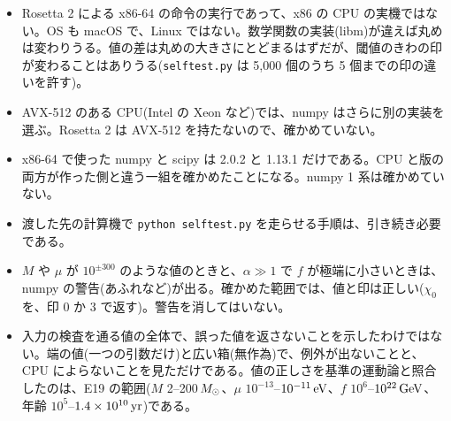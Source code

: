 \begin{caveat}
\begin{itemize}
\item Rosetta 2 による x86-64 の命令の実行であって、x86 の CPU の実機ではない。OS も macOS で、Linux ではない。数学関数の実装(libm)が違えば丸めは変わりうる。値の差は丸めの大きさにとどまるはずだが、閾値のきわの印が変わることはありうる(\texttt{selftest.py} は 5{,}000 個のうち 5 個までの印の違いを許す)。
\item AVX-512 のある CPU(Intel の Xeon など)では、numpy はさらに別の実装を選ぶ。Rosetta 2 は AVX-512 を持たないので、確かめていない。
\item x86-64 で使った numpy と scipy は 2.0.2 と 1.13.1 だけである。CPU と版の両方が作った側と違う一組を確かめたことになる。numpy 1 系は確かめていない。
\item 渡した先の計算機で \texttt{python selftest.py} を走らせる手順は、引き続き必要である。
\item $M$ や $\mu$ が $10^{\pm300}$ のような値のときと、$\alpha\gg1$ で $f$ が極端に小さいときは、numpy の警告(あふれなど)が出る。確かめた範囲では、値と印は正しい($\chi_0$ を、印 0 か 3 で返す)。警告を消してはいない。
\item 入力の検査を通る値の全体で、誤った値を返さないことを示したわけではない。端の値(一つの引数だけ)と広い箱(無作為)で、例外が出ないことと、CPU によらないことを見ただけである。値の正しさを基準の運動論と照合したのは、E19 の範囲($M$ 2--200$\,M_\odot$、$\mu$ $10^{-13}$--$10^{-11}\,\mathrm{eV}$、$f$ $10^{6}$--$10^{22}\,\mathrm{GeV}$、年齢 $10^5$--$1.4\times10^{10}\,\mathrm{yr}$)である。
\end{itemize}
\end{caveat}
